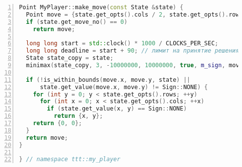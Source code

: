 \begin{lstlisting}[language=C++,caption={Реализация класса MyPlayer},label={lst:move_array},numbers=left]
Point MyPlayer::make_move(const State &state) {
  Point move = {state.get_opts().cols / 2, state.get_opts().rows / 2};
  if (state.get_move_no() == 0)
    return move;

  long long start = std::clock() * 1000 / CLOCKS_PER_SEC;
  long long deadline = start + 90; // лимит на принятие решения (мс)
  State state_copy = state;
  minimax(state_copy, 3, -10000000, 10000000, true, m_sign, move, deadline);

  if (!is_within_bounds(move.x, move.y, state) ||
      state.get_value(move.x, move.y) != Sign::NONE) {
    for (int y = 0; y < state.get_opts().rows; ++y)
      for (int x = 0; x < state.get_opts().cols; ++x)
        if (state.get_value(x, y) == Sign::NONE)
          return {x, y};
    return {0, 0};
  }
  return move;
}

} // namespace ttt::my_player
\end{lstlisting}